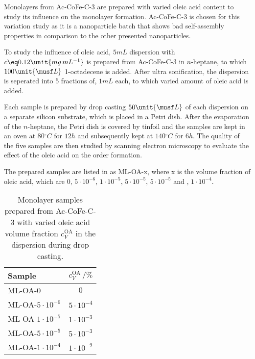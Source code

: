\documentclass[\main/dresen_thesis.tex]{subfiles}
\begin{document}
      Monolayers from Ac-CoFe-C-3 are prepared with varied oleic acid content to study its influence on the monolayer formation.
      Ac-CoFe-C-3 is chosen for this variation study as it is a nanoparticle batch that shows bad self-assembly properties in comparison to the other presented nanoparticles.

      To study the influence of oleic acid, $5 \unit{mL}$ dispersion with $c \eq 0.12 \unit{mg \, mL^{-1}}$ is prepared from Ac-CoFe-C-3 in $\mathit{n}$-heptane, to which $100 \unit{\musf L}$ 1-octadecene is added.
      After ultra sonification, the dispersion is seperated into 5 fractions of, $1 \unit{mL}$ each, to which varied amount of oleic acid is added.

      Each sample is prepared by drop casting $50 \unit{\musf L}$ of each dispersion on a separate silicon substrate, which is placed in a Petri dish.
      After the evaporation of the $\mathit{n}$-heptane, the Petri dish is covered by tinfoil and the samples are kept in an oven at $80 \unit{^\circ C}$ for $\unit{12 \unit{h}}$ and subsequently kept at $140 \unit{^\circ C}$ for $\unit{6 \unit{h}}$.
      The quality of the five samples are then studied by scanning electron microscopy to evaluate the effect of the oleic acid on the order formation.

      The prepared samples are listed in  as ML-OA-x, where x is the volume fraction of oleic acid, which are $0$, $5 \cdot 10^{-6}$, $1 \cdot 10^{-5}$, $5 \cdot 10^{-5}$, $5 \cdot 10^{-5}$ and , $1 \cdot 10^{-4}$.

      \begin{table}[!htbp]
        \centering
        \caption{\label{tab:monolayers:charMethod:OAVariation}Monolayer samples prepared from Ac-CoFe-C-3 with varied oleic acid volume fraction $c_V^\mathrm{OA}$ in the dispersion during drop casting.}
        \begin{tabular}{ l | c }
          \textbf{Sample} & $c_V^\mathrm{OA} \, / \%$\\
          \hline
          ML-OA-$0$ & $0$\\
          ML-OA-$5 \cdot 10^{-6}$ & $5 \cdot 10^{-4}$\\
          ML-OA-$1 \cdot 10^{-5}$ & $1 \cdot 10^{-3}$\\
          ML-OA-$5 \cdot 10^{-5}$ & $5 \cdot 10^{-3}$\\
          ML-OA-$1 \cdot 10^{-4}$ & $1 \cdot 10^{-2}$\\
          \hline
        \end{tabular}
      \end{table}
\end{document}
